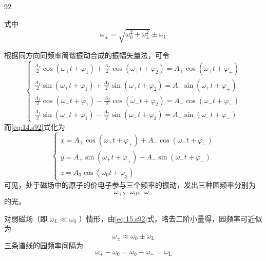 \begin{solution}{92}
\begin{subsolution}
\begin{equation}
\label{eq:14.s92}
\end{equation}
式中
\begin{equation}
\omega_ {\pm} = \sqrt {\omega_ {0} ^ {2} + \omega_ {\mathrm{L}} ^ {2}} \pm \omega_ {\mathrm{L}}
\label{eq:15.s92}
\end{equation}
\end{subsolution}
\begin{subsolution}
根据同方向同频率简谐振动合成的振幅矢量法，可令
\begin{equation}
\left\{ \begin{array}{l} \frac {A _ {1}}{2} \cos (\omega_ {+} t + \varphi_ {1}) + \frac {A _ {2}}{2} \cos (\omega_ {+} t + \varphi_ {2}) = A _ {+} \cos (\omega_ {+} t + \varphi_ {+}) \\ \frac {A _ {1}}{2} \sin (\omega_ {+} t + \varphi_ {1}) + \frac {A _ {2}}{2} \sin (\omega_ {+} t + \varphi_ {2}) = A _ {+} \sin (\omega_ {+} t + \varphi_ {+}) \\ \frac {A _ {1}}{2} \cos (\omega_ {-} t + \varphi_ {1}) - \frac {A _ {2}}{2} \cos (\omega_ {-} t + \varphi_ {2}) = A _ {-} \cos (\omega_ {-} t + \varphi_ {-}) \\ \frac {A _ {1}}{2} \sin (\omega_ {-} t + \varphi_ {1}) - \frac {A _ {2}}{2} \sin (\omega_ {-} t + \varphi_ {2}) = A _ {-} \sin (\omega_ {-} t + \varphi_ {-}) \end{array} \right.
\label{eq:16.s92}
\end{equation}
而\eqref{eq:14.s92}式化为
\begin{equation}
\left\{ \begin{array}{l} x = A _ {+} \cos \left(\omega_ {+} t + \varphi_ {+}\right) + A _ {-} \cos \left(\omega_ {-} t + \varphi_ {-}\right) \\ y = A _ {+} \sin \left(\omega_ {+} t + \varphi_ {+}\right) - A _ {-} \sin \left(\omega_ {-} t + \varphi_ {-}\right) \\ z = A _ {3} \cos \left(\omega_ {0} t + \varphi_ {3}\right) \end{array} \right.
\label{eq:17.s92}
\end{equation}
可见，处于磁场中的原子的价电子参与三个频率的振动，发出三种园频率分别为
\begin{equation}
\omega_ {+} \text {、} \omega_ {0} \text {、} \omega_ {-}
\label{eq:18.s92}
\end{equation}
的光。

对弱磁场（即 $\omega_{L} \ll \omega_{0}$ ）情形，由\eqref{eq:15.s92}式，略去二阶小量得，园频率可近似为
\begin{equation}
\omega_ {\pm} \approx \omega_ {0} \pm \omega_ {\mathrm{L}}
\label{eq:19.s92}
\end{equation}
三条谱线的园频率间隔为
\begin{equation}
\omega_ {+} - \omega_ {0} = \omega_ {0} - \omega_ {-} = \omega_ {\mathrm{L}}
\label{eq:20.s92}
\end{equation}
\end{subsolution}
\end{solution}